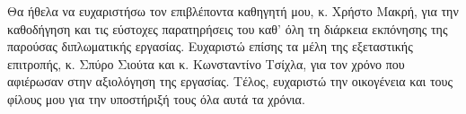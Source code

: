 \begin{acknowledgements}
    Θα ήθελα να ευχαριστήσω τον επιβλέποντα καθηγητή μου, κ.
    Χρήστο Μακρή, για την καθοδήγηση και τις εύστοχες παρατηρήσεις του καθ' όλη τη διάρκεια εκπόνησης της παρούσας διπλωματικής εργασίας.
    Ευχαριστώ επίσης τα μέλη της εξεταστικής επιτροπής, κ.
    Σπύρο Σιούτα και κ.
    Κωνσταντίνο Τσίχλα, για τον χρόνο που αφιέρωσαν στην αξιολόγηση της εργασίας.
    Τέλος, ευχαριστώ την οικογένεια και τους φίλους μου για την υποστήριξή τους όλα αυτά τα χρόνια.
\end{acknowledgements}
